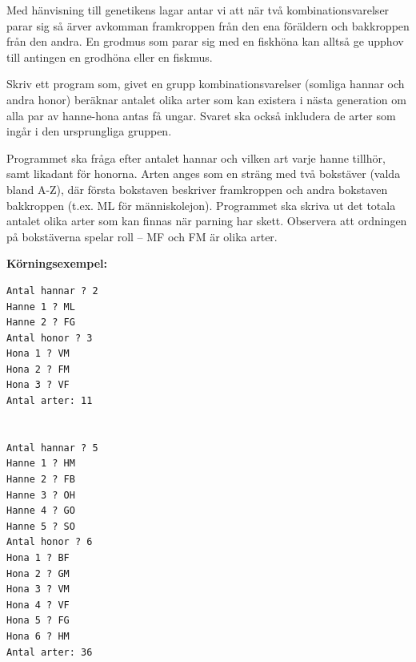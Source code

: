 \documentclass[a4paper,12pt]{article}
\begin{document}
Med hänvisning till genetikens lagar antar vi att när två kombinationsvarelser parar sig så ärver avkomman framkroppen från den ena föräldern och bakkroppen från den andra. En grodmus som parar sig med en fiskhöna kan alltså ge upphov till antingen en grodhöna eller en fiskmus.

Skriv ett program som, givet en grupp kombinationsvarelser (somliga hannar och andra honor) beräknar antalet olika arter som kan existera i nästa generation om alla par av hanne-hona antas få ungar. Svaret ska också inkludera de arter som ingår i den ursprungliga gruppen.

Programmet ska fråga efter antalet hannar och vilken art varje hanne tillhör, samt likadant för honorna. Arten anges som en sträng med två bokstäver (valda bland A-Z), där första bokstaven beskriver framkroppen och andra bokstaven bakkroppen (t.ex. ML för människolejon). Programmet ska skriva ut det totala antalet olika arter som kan finnas när parning har skett. Observera att ordningen på bokstäverna spelar roll – MF och FM är olika arter.


\textbf{Körningsexempel:}
\begin{lstlisting}
Antal hannar ? 2  
Hanne 1 ? ML  
Hanne 2 ? FG 
Antal honor ? 3 
Hona 1 ? VM 
Hona 2 ? FM 
Hona 3 ? VF 
Antal arter: 11 


Antal hannar ? 5 
Hanne 1 ? HM  
Hanne 2 ? FB 
Hanne 3 ? OH 
Hanne 4 ? GO 
Hanne 5 ? SO 
Antal honor ? 6
Hona 1 ? BF 
Hona 2 ? GM 
Hona 3 ? VM 
Hona 4 ? VF 
Hona 5 ? FG 
Hona 6 ? HM 
Antal arter: 36
\end{lstlisting}

\end{document}
